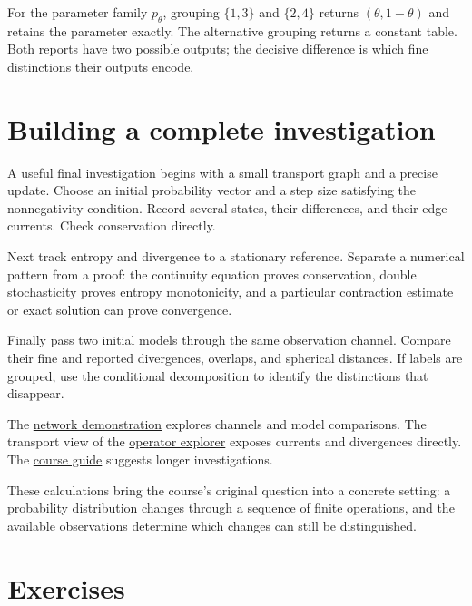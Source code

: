 \documentclass[11pt,oneside,openany]{book}
\theoremstyle{definition}
\theoremstyle{remark}
\numberwithin{equation}{chapter}
\begin{document}
For the parameter family \(p_\theta\), grouping \(\{1,3\}\) and \(\{2,4\}\) returns \((\theta,1-\theta)\) and retains the parameter exactly. The alternative grouping returns a constant table. Both reports have two possible outputs; the decisive difference is which fine distinctions their outputs encode.

\section{Building a complete investigation}\label{ch10-building-a-complete-investigation}

A useful final investigation begins with a small transport graph and a precise update. Choose an initial probability vector and a step size satisfying the nonnegativity condition. Record several states, their differences, and their edge currents. Check conservation directly.

Next track entropy and divergence to a stationary reference. Separate a numerical pattern from a proof: the continuity equation proves conservation, double stochasticity proves entropy monotonicity, and a particular contraction estimate or exact solution can prove convergence.

Finally pass two initial models through the same observation channel. Compare their fine and reported divergences, overlaps, and spherical distances. If labels are grouped, use the conditional decomposition to identify the distinctions that disappear.

The \href{https://bobovski66.github.io/IntroDiscreteInfoGeom/demos/week10.html}{network demonstration} explores channels and model comparisons. The transport view of the \href{https://bobovski66.github.io/IntroDiscreteInfoGeom/demos/operator-explorer.html}{operator explorer} exposes currents and divergences directly. The \href{https://bobovski66.github.io/IntroDiscreteInfoGeom/guide.html\#capstone}{course guide} suggests longer investigations.

These calculations bring the course's original question into a concrete setting: a probability distribution changes through a sequence of finite operations, and the available observations determine which changes can still be distinguished.

\section{Exercises}\label{ch10-exercises}
\end{document}
